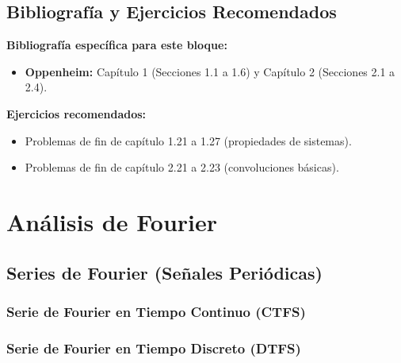 \documentclass[11pt,a4paper,openany]{book}
\begin{document}
	\chapter*{Bibliografía y Ejercicios Recomendados}
	
	\textbf{Bibliografía específica para este bloque:}
	\begin{itemize}
		\item \textbf{Oppenheim:} Capítulo 1 (Secciones 1.1 a 1.6) y Capítulo 2 (Secciones 2.1 a 2.4).
	\end{itemize}
	
	\textbf{Ejercicios recomendados:}
	\begin{itemize}
		\item Problemas de fin de capítulo 1.21 a 1.27 (propiedades de sistemas).
		\item Problemas de fin de capítulo 2.21 a 2.23 (convoluciones básicas).
	\end{itemize}
	

\part{Análisis de Fourier}


\chapter{Series de Fourier (Señales Periódicas)}

\section{Serie de Fourier en Tiempo Continuo (CTFS)}

\section{Serie de Fourier en Tiempo Discreto (DTFS)}
\end{document}
